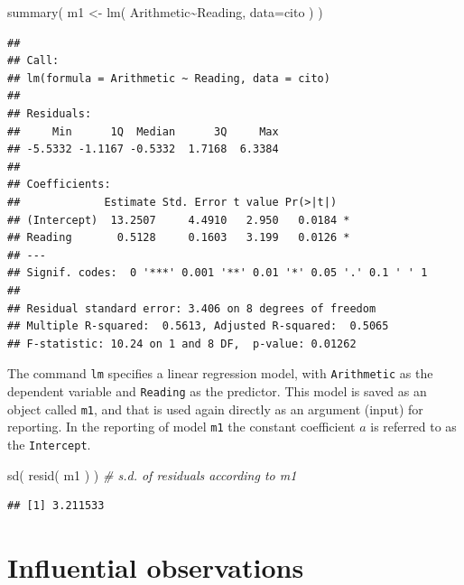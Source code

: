 \documentclass[
]{book}
\newenvironment{Shaded}{\begin{snugshade}}{\end{snugshade}}
\newcommand{\AttributeTok}[1]{\textcolor[rgb]{0.77,0.63,0.00}{#1}}
\newcommand{\CommentTok}[1]{\textcolor[rgb]{0.56,0.35,0.01}{\textit{#1}}}
\newcommand{\FunctionTok}[1]{\textcolor[rgb]{0.00,0.00,0.00}{#1}}
\newcommand{\NormalTok}[1]{#1}
\newcommand{\OtherTok}[1]{\textcolor[rgb]{0.56,0.35,0.01}{#1}}
\newcommand{\SpecialCharTok}[1]{\textcolor[rgb]{0.00,0.00,0.00}{#1}}
\begin{document}
\begin{Shaded}
\begin{Highlighting}[]
\FunctionTok{summary}\NormalTok{( m1 }\OtherTok{\textless{}{-}} \FunctionTok{lm}\NormalTok{( Arithmetic}\SpecialCharTok{\textasciitilde{}}\NormalTok{Reading, }\AttributeTok{data=}\NormalTok{cito ) )}
\end{Highlighting}
\end{Shaded}

\begin{verbatim}
## 
## Call:
## lm(formula = Arithmetic ~ Reading, data = cito)
## 
## Residuals:
##     Min      1Q  Median      3Q     Max 
## -5.5332 -1.1167 -0.5332  1.7168  6.3384 
## 
## Coefficients:
##             Estimate Std. Error t value Pr(>|t|)  
## (Intercept)  13.2507     4.4910   2.950   0.0184 *
## Reading       0.5128     0.1603   3.199   0.0126 *
## ---
## Signif. codes:  0 '***' 0.001 '**' 0.01 '*' 0.05 '.' 0.1 ' ' 1
## 
## Residual standard error: 3.406 on 8 degrees of freedom
## Multiple R-squared:  0.5613, Adjusted R-squared:  0.5065 
## F-statistic: 10.24 on 1 and 8 DF,  p-value: 0.01262
\end{verbatim}

The command \texttt{lm} specifies a linear regression model, with \texttt{Arithmetic}
as the dependent variable and \texttt{Reading} as the predictor. This model is
saved as an object called \texttt{m1}, and that is used again directly as an argument
(input) for reporting. In the reporting of model \texttt{m1} the constant coefficient
\(a\) is referred to as the \texttt{Intercept}.

\begin{Shaded}
\begin{Highlighting}[]
\FunctionTok{sd}\NormalTok{( }\FunctionTok{resid}\NormalTok{( m1 ) ) }\CommentTok{\# s.d. of residuals according to \textasciigrave{}m1\textasciigrave{}}
\end{Highlighting}
\end{Shaded}

\begin{verbatim}
## [1] 3.211533
\end{verbatim}

\hypertarget{influential-observations}{%
\section{Influential observations}\label{influential-observations}}
\end{document}
